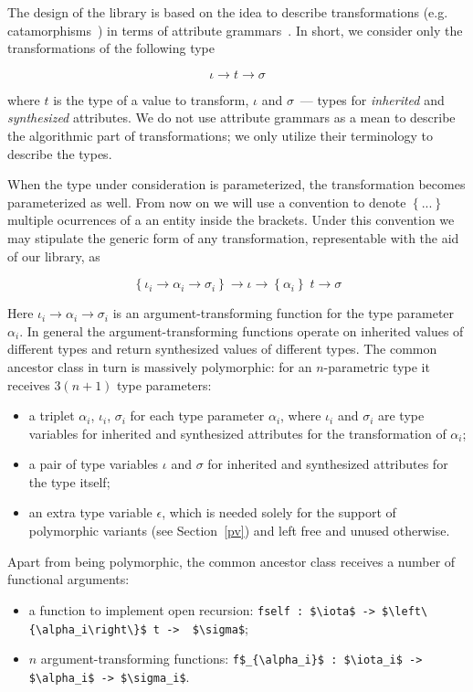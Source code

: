 The design of the library is based on the idea to describe transformations (e.g. catamorphisms~\cite{Bananas}) in terms of attribute grammars~\cite{AGKnuth,AGSwierstra,ObjectAlgebrasAttribute}.
In short, we consider only the transformations of the following type

\[
\iota \to t \to \sigma
\]

where $t$ is the type of a value to transform, $\iota$ and $\sigma$~--- types for \emph{inherited} and \emph{synthesized} attributes. We do not use attribute
grammars as a mean to describe the algorithmic part of transformations; we only utilize their terminology to describe the types. 

When the type under consideration is parameterized, the transformation becomes parameterized as well. From now on we will use a convention to
denote $\left\{...\right\}$ multiple ocurrences of a an entity inside the brackets. Under this convention we may stipulate the generic form of
any transformation, representable with the aid of our library, as

\[
  \left\{\iota_i \to \alpha_i \to \sigma_i\right\}\to\iota \to\left\{\alpha_i\right\}\;t \to \sigma
\]

Here $\iota_i\to\alpha_i\to\sigma_i$ is an argument-transforming function for the type parameter $\alpha_i$. In general the argument-transforming functions operate on
inherited values of different types and return synthesized values of different types. The common ancestor class in turn is massively polymorphic: for an $n$-parametric
type it receives $3(n+1)$ type parameters:

\begin{itemize}
\item a triplet $\alpha_i$, $\iota_i$, $\sigma_i$ for each type parameter $\alpha_i$, where $\iota_i$ and $\sigma_i$ are type variables for inherited and
  synthesized attributes for the transformation of $\alpha_i$;
\item a pair of type variables $\iota$ and $\sigma$ for inherited and synthesized attributes for the type itself;
\item an extra type variable $\epsilon$, which is needed solely for the support of polymorphic variants (see Section~\ref{pv}) and left free and unused
  otherwise.
\end{itemize}

Apart from being polymorphic, the common ancestor class receives a number of functional arguments:

\begin{itemize}
\item a function to implement open recursion: \lstinline|fself : $\iota$ -> $\left\{\alpha_i\right\}$ t ->  $\sigma$|;
\item $n$ argument-transforming functions: \lstinline|f$_{\alpha_i}$ : $\iota_i$ -> $\alpha_i$ -> $\sigma_i$|.
\end{itemize}

